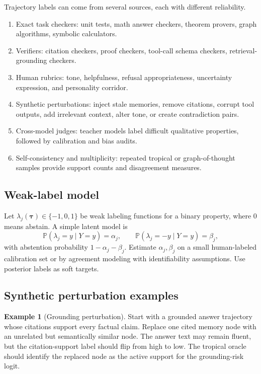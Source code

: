 \documentclass[11pt]{article}
\theoremstyle{definition}
\newtheorem{example}[theorem]{Example}
\theoremstyle{remark}
\newcommand{\Prob}{\mathbb{P}}
\newcommand{\traj}{\boldsymbol{\tau}}
\numberwithin{equation}{section}
\begin{document}
Trajectory labels can come from several sources, each with different reliability.
\begin{enumerate}
    \item Exact task checkers: unit tests, math answer checkers, theorem provers, graph algorithms, symbolic calculators.
    \item Verifiers: citation checkers, proof checkers, tool-call schema checkers, retrieval-grounding checkers.
    \item Human rubrics: tone, helpfulness, refusal appropriateness, uncertainty expression, and personality corridor.
    \item Synthetic perturbations: inject stale memories, remove citations, corrupt tool outputs, add irrelevant context, alter tone, or create contradiction pairs.
    \item Cross-model judges: teacher models label difficult qualitative properties, followed by calibration and bias audits.
    \item Self-consistency and multiplicity: repeated tropical or graph-of-thought samples provide support counts and disagreement measures.
\end{enumerate}

\subsection{Weak-label model}

Let \(\lambda_j(\traj)\in\{-1,0,1\}\) be weak labeling functions for a binary property, where 0 means abstain.  A simple latent model is
\begin{equation}
    \Prob(\lambda_j=y\mid Y=y)=\alpha_j,\qquad \Prob(\lambda_j=-y\mid Y=y)=\beta_j,
\end{equation}
with abstention probability \(1-\alpha_j-\beta_j\).  Estimate \(\alpha_j,\beta_j\) on a small human-labeled calibration set or by agreement modeling with identifiability assumptions.  Use posterior labels as soft targets.

\subsection{Synthetic perturbation examples}

\begin{example}[Grounding perturbation]
Start with a grounded answer trajectory whose citations support every factual claim.  Replace one cited memory node with an unrelated but semantically similar node.  The answer text may remain fluent, but the citation-support label should flip from high to low.  The tropical oracle should identify the replaced node as the active support for the grounding-risk logit.
\end{example}
\end{document}
